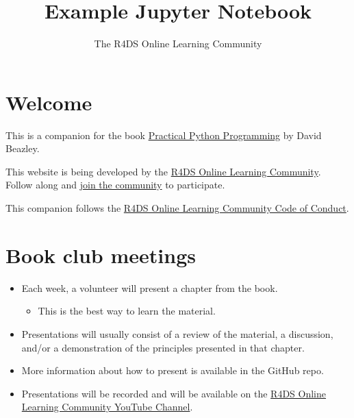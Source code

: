 \documentclass[
  letterpaper,
  DIV=11,
  numbers=noendperiod]{scrreprt}
\title{Example Jupyter Notebook}
\subtitle{The R4DS Online Learning Community}
\author{}
\date{}
\providecommand{\tightlist}{%
  \setlength{\itemsep}{0pt}\setlength{\parskip}{0pt}}
\renewcommand*\contentsname{Table of contents}
\begin{document}
\maketitle

\ifdefined\Shaded\renewenvironment{Shaded}{\begin{tcolorbox}[interior hidden, frame hidden, borderline west={3pt}{0pt}{shadecolor}, enhanced, boxrule=0pt, sharp corners]}{\end{tcolorbox}}\fi

\renewcommand*\contentsname{Table of contents}
{
\hypersetup{linkcolor=}
\setcounter{tocdepth}{2}
\tableofcontents
}
\hypertarget{welcome}{%
\section*{Welcome}\label{welcome}}

This is a companion for the book
\href{https://dabeaz-course.github.io/practical-python/}{Practical
Python Programming} by David Beazley.

This website is being developed by the
\href{https://rfordatasci.com/}{R4DS Online Learning Community}. Follow
along and \href{https://r4ds.io/join}{join the community} to
participate.

This companion follows the \href{https://r4ds.io/conduct}{R4DS Online
Learning Community Code of Conduct}.

\hypertarget{book-club-meetings}{%
\section*{Book club meetings}\label{book-club-meetings}}

\begin{itemize}
\item
  Each week, a volunteer will present a chapter from the book.

  \begin{itemize}
  \tightlist
  \item
    This is the best way to learn the material.
  \end{itemize}
\item
  Presentations will usually consist of a review of the material, a
  discussion, and/or a demonstration of the principles presented in that
  chapter.
\item
  More information about how to present is available in the GitHub repo.
\item
  Presentations will be recorded and will be available on the
  \href{https://r4ds.io/youtube}{R4DS Online Learning Community YouTube
  Channel}.
\end{itemize}
\end{document}
